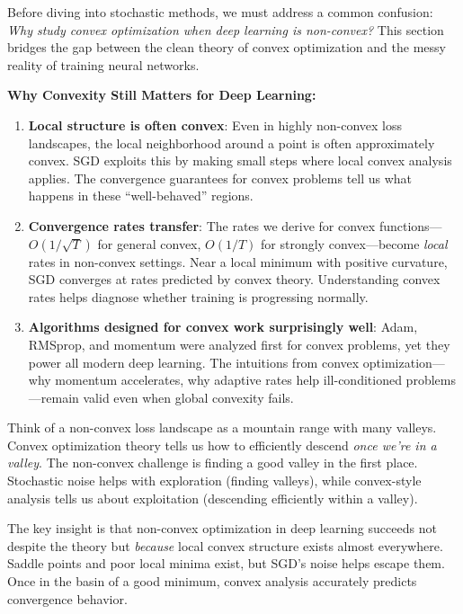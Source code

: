 \documentclass[../../main.tex]{subfiles}
\begin{document}
Before diving into stochastic methods, we must address a common confusion: \textit{Why study convex optimization when deep learning is non-convex?} This section bridges the gap between the clean theory of convex optimization and the messy reality of training neural networks.

\begin{keyconcept}
\textbf{Why Convexity Still Matters for Deep Learning:}

\begin{enumerate}
    \item \textbf{Local structure is often convex}: Even in highly non-convex loss landscapes, the local neighborhood around a point is often approximately convex. SGD exploits this by making small steps where local convex analysis applies. The convergence guarantees for convex problems tell us what happens in these ``well-behaved'' regions.

    \item \textbf{Convergence rates transfer}: The rates we derive for convex functions---$O(1/\sqrt{T})$ for general convex, $O(1/T)$ for strongly convex---become \textit{local} rates in non-convex settings. Near a local minimum with positive curvature, SGD converges at rates predicted by convex theory. Understanding convex rates helps diagnose whether training is progressing normally.

    \item \textbf{Algorithms designed for convex work surprisingly well}: Adam, RMSprop, and momentum were analyzed first for convex problems, yet they power all modern deep learning. The intuitions from convex optimization---why momentum accelerates, why adaptive rates help ill-conditioned problems---remain valid even when global convexity fails.
\end{enumerate}
\end{keyconcept}

\begin{intuition}
Think of a non-convex loss landscape as a mountain range with many valleys. Convex optimization theory tells us how to efficiently descend \textit{once we're in a valley}. The non-convex challenge is finding a good valley in the first place. Stochastic noise helps with exploration (finding valleys), while convex-style analysis tells us about exploitation (descending efficiently within a valley).
\end{intuition}

The key insight is that non-convex optimization in deep learning succeeds not despite the theory but \textit{because} local convex structure exists almost everywhere. Saddle points and poor local minima exist, but SGD's noise helps escape them. Once in the basin of a good minimum, convex analysis accurately predicts convergence behavior.
\end{document}
